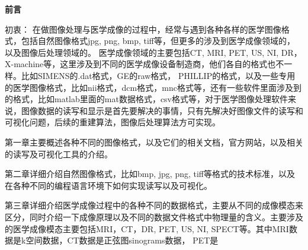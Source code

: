 
\par
\textbf{前言}
\par


初衷：
在做图像处理与医学成像的过程中，经常与遇到各种各样的医学图像格式，包括自然图像格式jpg, png, bmp, tiff等，但更多的涉及到医学成像领域的，以及图像后处理领域的。
医学成像领域的主要包括CT, MRI, PET, US, NI, DR，X-machine等，这里涉及到不同的医学成像设备制造商，他们各自的格式也不一样。比如SIMENS的.dat格式，GE的raw格式， PHILLIP的格式，以及一些专用的医学图像格式，比如nii格式，dcm格式，mnc格式等，还有一些软件里面涉及到的格式，比如matlab里面的mat数据格式，csv格式等，对于医学图像处理软件来说，图像数据的读写和显示是首先要解决的事情，只有先解决好图像文件的读写和可视化问题，后续的重建算法，图像后处理算法方可实现。


第一章主要概述各种不同的图像格式，以及它们的相关文档，官方网站，以及相关的读写及可视化工具的介绍。


第二章详细介绍自然图像格式，比如bmp, jpg, png, tiff等格式的技术标准，以及在各种不同的编程语言环境下如何实现读写以及可视化。

第三章详细介绍医学成像过程中的各种不同的数据格式，主要从不同的成像模态来区分，同时介绍一下成像原理以及不同的数据文件格式中物理量的含义。主要涉及的医学成像模态主要包括MRI，CT，DR, PET, US, NI, SPECT等。其中MRI数据是k空间数据，CT数据是正弦图sinograms数据， PET是
